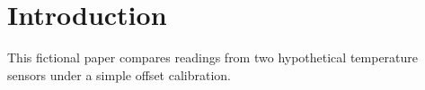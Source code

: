 \section{Introduction}
This fictional paper compares readings from two hypothetical temperature sensors under a simple offset calibration.
